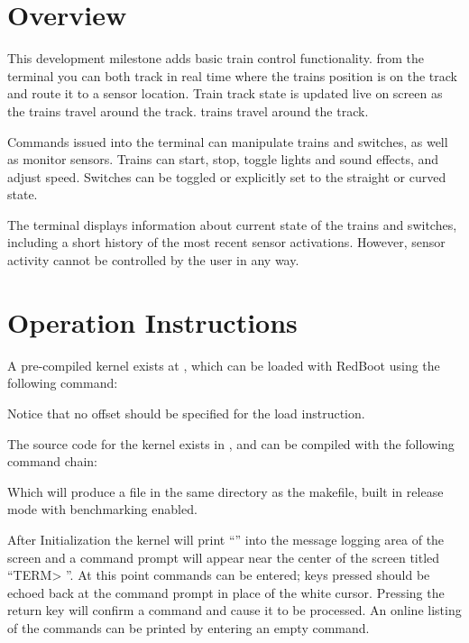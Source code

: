 \documentclass[pdftex,10pt,a4paper]{article}
\begin{document}

\section*{Overview}

This development milestone adds basic train control functionality.
from the terminal you can both track in real time where the trains position
is on the track and route it to a sensor location. Train track state is updated
live on screen as the trains travel around the track.
trains travel around the track.

Commands issued into the terminal can manipulate trains and
switches, as well as monitor sensors. Trains can start, stop, toggle
lights and sound effects, and adjust speed. Switches can be toggled or
explicitly set to the straight or curved state.

The terminal displays information about current state
of the trains and switches, including a short history of the most
recent sensor activations. However, sensor activity cannot be
controlled by the user in any way.


\section*{Operation Instructions}

A pre-compiled kernel exists at
, which can be loaded with
RedBoot using the following command:

\begin{center}
\end{center}

Notice that no offset should be specified for the load instruction.

The source code for the kernel exists in ,
and can be compiled with the following command chain:

\begin{center}
\end{center}

Which will produce a  file in the same directory as
the makefile, built in release mode with benchmarking enabled.

After Initialization the kernel will print
``'' into the message logging area of
the screen and a command prompt will appear near the center of the
screen titled ``TERM> ''. At this point commands can be entered; keys
pressed should be echoed back at the command prompt in place of the
white cursor. Pressing the return key will confirm a command and cause
it to be processed. An online listing of the commands can be printed
by entering an empty command.
\end{document}
